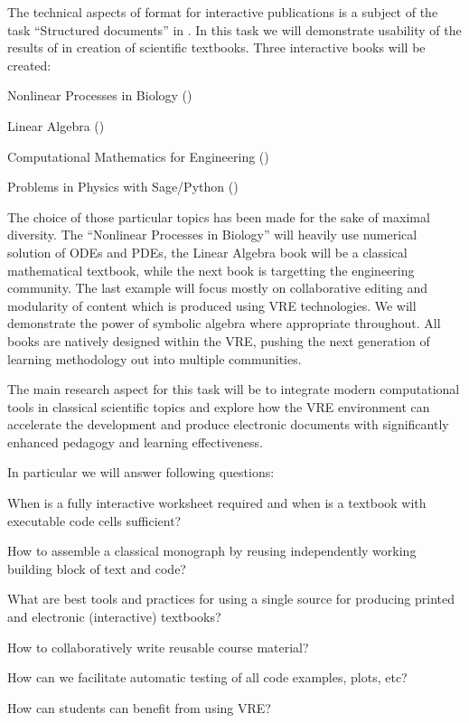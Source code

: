 \begin{workpackage}
\begin{tasklist}
\begin{task}[title=Demonstrator: Interactive books,
id=ibook,lead=US,partners={USO,XFEL},PM=42,wphases={0-46,40-46},issue=32]
The technical aspects of format for interactive publications is a
subject of the task ``Structured documents'' in
. In this task we will demonstrate usability
of the results of  in creation of scientific
textbooks. Three interactive books will be created:

\begin{compactitem}
\item Nonlinear Processes in Biology ()
\item Linear Algebra ()
\item Computational Mathematics for Engineering  ()  %
\item Problems in Physics with Sage/Python ()
\end{compactitem}

The choice of those particular topics has been made for the sake of
maximal diversity. The ``Nonlinear Processes in Biology'' will heavily
use numerical solution of ODEs and PDEs, the Linear Algebra book will
be a classical mathematical textbook, while the next book is
targetting the engineering community.  The last example will focus
mostly on collaborative editing and modularity of content which is
produced using VRE technologies. We will demonstrate the power of
symbolic algebra where appropriate throughout.  All books are natively
designed within the VRE, pushing the next generation of learning
methodology out into multiple communities.

The main research aspect for this task will be to integrate modern
computational tools in classical scientific topics and explore how
the VRE environment can accelerate the development and produce electronic
documents with significantly enhanced pedagogy and learning effectiveness.

In particular we will answer following questions:
\begin{compactitem}
\item When is a fully interactive worksheet required and when is
  a textbook with executable code cells sufficient?
\item How to assemble a classical monograph by reusing independently working
  building block of text and code?
\item What are best tools and practices for using a single source for
  producing printed and electronic (interactive) textbooks?
\item How to collaboratively write reusable course material?
\item How can we facilitate automatic testing of all code examples, plots, etc?
\item How can students can benefit from using VRE?
\end{compactitem}
\end{task}


\end{tasklist}
\end{workpackage}

